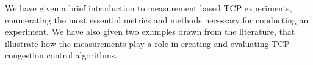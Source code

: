 We have given a brief introduction to measurement based TCP experiments, enumerating the most essential metrics and methods necessary for conducting an experiment. We have also given two examples drawn from the literature, that illustrate how the measurements play a role in creating and evaluating TCP congestion control algorithms. 
